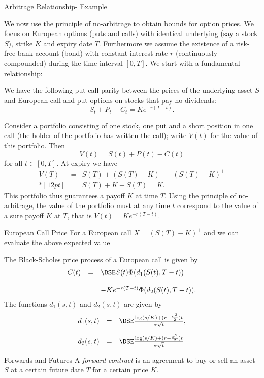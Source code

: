 Arbitrage Relationship- Example

We now use the principle of no-arbitrage to obtain bounds for
option prices. We focus on
European options (puts and calls) with identical underlying (say a
stock $S$), strike $K$ and expiry date $T$. Furthermore we assume
the existence of a risk-free bank account (bond) with constant
interest rate $r$ (continuously compounded) during the time
interval $[0,T]$. We start with a fundamental relationship:

We have the following  put-call parity between the prices of the
underlying asset $S$ and European call and put options on stocks
that pay no dividends:
\begin{equation}\label{Europutcall}
S_t + P_t - C_t = K e^{-r(T-t)}.
\end{equation}

Consider a portfolio consisting of one stock, one put
and a short position in one call (the holder of the portfolio has
written the call); write $V(t)$ for the value of this portfolio.
Then
	$$
	V(t) = S(t) + P(t) - C(t)
	$$
for all $t \in [0,T]$. At expiry we have
	$$
	\begin{array}{lll}
	V(T)&=&S(T)+(S(T)-K)^--(S(T)-K)^+\\*[12pt]
	&=&S(T)+K-S(T)=K.
	\end{array}
	$$
This portfolio thus guarantees a payoff $K$ at time $T$. Using the
principle of no-arbitrage, the value of the portfolio must at any
time $t$ correspond to the value of a sure payoff $K$ at $T$, that
is $V(t)=K e^{-r(T-t)}$. \hfill \eb


European Call Price
	For a European call $X = (S(T)-K)^+$ and  we can evaluate the
	above expected value

	The Black-Scholes price
	pro\-cess of a European call is given by
	$$
	\begin{array}{lll}
	C(t) &=&\DSE S(t) \Phi(d_1(S(t), T-t))\\*[12pt]
	&&- K e^{-r(T-t)} \Phi(d_2(S(t), T-t)).
	\end{array}
	$$
	The functions $d_1(s,t)$ and $d_2(s,t)$ are given by
	$$
	\begin{array}{lll}
	d_1(s,t) &=&\DSE \frac{\log(s/K) + (r +
	\frac{\sigma^2}{2})t}{\sigma \sqrt{t}},\\*[12pt] d_2(s,t) &=&\DSE
	 \frac{\log(s/K) + (r -
	\frac{\sigma^2}{2})t}{\sigma \sqrt{t}}
	\end{array}
	$$




Forwards and Futures
	A {\it forward contract} is an agreement to buy or sell an asset $S$ at a certain future
	date $T$ for a certain price $K$.

